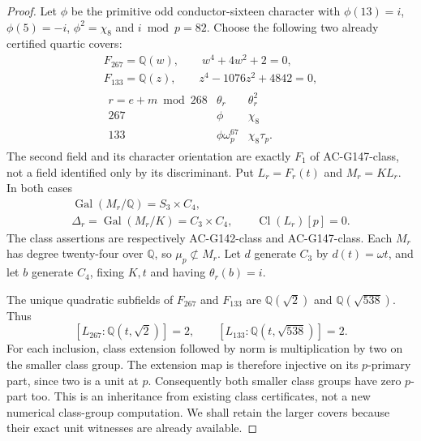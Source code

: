 \begin{proof}
Let $\phi$ be the primitive odd conductor-sixteen character with
$\phi(13)=i$, $\phi(5)=-i$, $\phi^2=\chi_8$ and
$i\bmod p=82$.
Choose the following two already certified quartic covers:
\[
 \begin{gathered}
 F_{267}=\mathbb Q(w),\qquad w^4+4w^2+2=0,\\
 F_{133}=\mathbb Q(z),\qquad z^4-1076z^2+4842=0,\\
 \begin{array}{c|c|c}
 r=e+m\bmod268&\theta_r&\theta_r^2\\ \hline
 267&\phi&\chi_8\\
 133&\phi\omega_p^{67}&\chi_8\tau_p .
 \end{array}
 \end{gathered}
 \tag{Q8P.4}
\]
The second field and its character orientation are exactly
$F_1$ of AC-G147-class, not a field identified only by its discriminant.
Put $L_r=F_r(t)$ and $M_r=KL_r$.
In both cases
\[
 \begin{gathered}
 \operatorname{Gal}(M_r/\mathbb Q)=S_3\times C_4,\\
 \Delta_r=\operatorname{Gal}(M_r/K)=C_3\times C_4,\qquad
 \operatorname{Cl}(L_r)[p]=0.
 \end{gathered}
 \tag{Q8P.5}
\]
The class assertions are respectively AC-G142-class and AC-G147-class.
Each $M_r$ has degree twenty-four over $\mathbb Q$, so
$\mu_p\not\subset M_r$.
Let $d$ generate $C_3$ by $d(t)=\omega t$, and let $b$
generate $C_4$, fixing $K,t$ and having $\theta_r(b)=i$.

The unique quadratic subfields of $F_{267}$ and $F_{133}$
are $\mathbb Q(\sqrt2)$ and $\mathbb Q(\sqrt{538})$.
Thus
\[
 [L_{267}:\mathbb Q(t,\sqrt2)]=2,\qquad
 [L_{133}:\mathbb Q(t,\sqrt{538})]=2 .
 \tag{Q8P.6}
\]
For each inclusion, class extension followed by norm is multiplication
by two on the smaller class group.
The extension map is therefore injective on its $p$-primary part,
since two is a unit at $p$.
Consequently both smaller class groups have zero $p$-part too.
This is an inheritance from existing class certificates, not a
new numerical class-group computation.
We shall retain the larger covers because their exact unit witnesses
are already available.


\end{proof}
